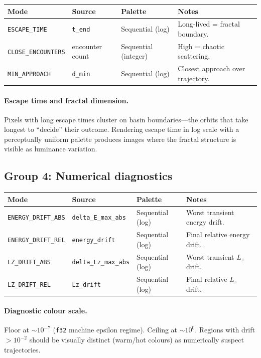 \documentclass[11pt]{report}
\begin{document}
\begin{center}
\begin{tabular}{llll}
\toprule
Mode & Source & Palette & Notes \\
\midrule
\texttt{ESCAPE\_TIME} & \texttt{t\_end} & Sequential (log) & Long-lived = fractal boundary. \\
\texttt{CLOSE\_ENCOUNTERS} & encounter count & Sequential (integer) & High = chaotic scattering. \\
\texttt{MIN\_APPROACH} & \texttt{d\_min} & Sequential (log) & Closest approach over trajectory. \\
\bottomrule
\end{tabular}
\end{center}

\paragraph{Escape time and fractal dimension.} Pixels with long escape times cluster on basin boundaries---the orbits that take longest to ``decide'' their outcome. Rendering escape time in log scale with a perceptually uniform palette produces images where the fractal structure is visible as luminance variation.

\subsection{Group 4: Numerical diagnostics}

\begin{center}
\begin{tabular}{llll}
\toprule
Mode & Source & Palette & Notes \\
\midrule
\texttt{ENERGY\_DRIFT\_ABS} & \texttt{delta\_E\_max\_abs} & Sequential (log) & Worst transient energy drift. \\
\texttt{ENERGY\_DRIFT\_REL} & \texttt{energy\_drift} & Sequential (log) & Final relative energy drift. \\
\texttt{LZ\_DRIFT\_ABS} & \texttt{delta\_Lz\_max\_abs} & Sequential (log) & Worst transient $L_z$ drift. \\
\texttt{LZ\_DRIFT\_REL} & \texttt{Lz\_drift} & Sequential (log) & Final relative $L_z$ drift. \\
\bottomrule
\end{tabular}
\end{center}

\paragraph{Diagnostic colour scale.} Floor at $\sim 10^{-7}$ (\texttt{f32} machine epsilon regime). Ceiling at $\sim 10^{0}$. Regions with drift $>10^{-2}$ should be visually distinct (warm/hot colours) as numerically suspect trajectories.
\end{document}
